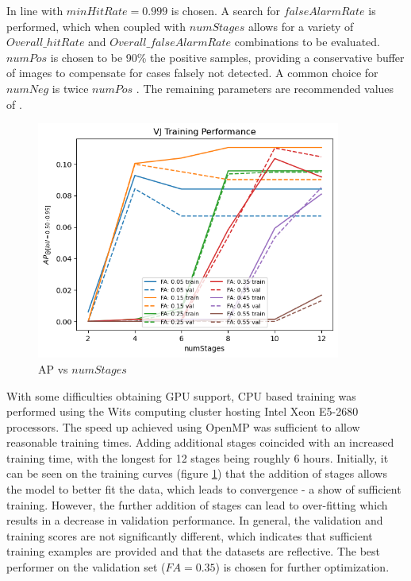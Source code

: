 \documentclass[a4paper,twoside,12pt]{report}
\begin{document}
In line with \cite{robovj} $minHitRate = 0.999$ is chosen. A search for $falseAlarmRate$ is performed, which when coupled with $numStages$ allows for a variety of $Overall\_hitRate$ and $Overall\_falseAlarmRate$ combinations to be evaluated. $numPos$ is chosen to be 90\% the positive samples, providing a conservative buffer of images to compensate for cases falsely not detected. A common choice for $numNeg$ is twice $numPos$ \citep{numneg}. The remaining parameters are recommended values of \cite{vjdataset}.

\begin{figure}[h!]
\begin{center}
\includegraphics[width=10cm]{images/vj_training.png}
\caption{AP vs $numStages$}
\label{fig:vjstages}
\end{center}
\end{figure}

With some difficulties obtaining GPU support, CPU based training was performed using the Wits computing cluster hosting Intel Xeon E5-2680 processors. The speed up achieved using OpenMP was sufficient to allow reasonable training times. Adding additional stages coincided with an increased training time, with the longest for 12 stages being roughly 6 hours. Initially, it can be seen on the training curves (figure \ref{fig:vjstages}) that the addition of stages allows the model to better fit the data, which leads to convergence - a show of sufficient training. However, the further addition of stages can lead to over-fitting which results in a decrease in validation performance. In general, the validation and training scores are not significantly different, which indicates that sufficient training examples are provided and that the datasets are reflective. The best performer on the validation set ($FA=0.35$) is chosen for further optimization.
\end{document}
